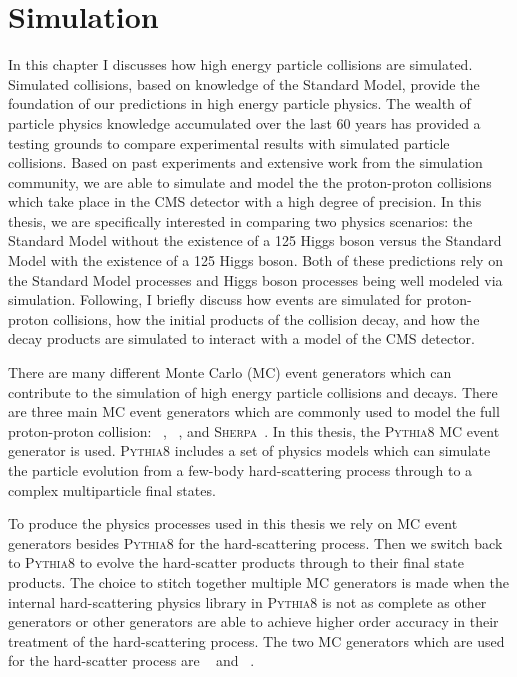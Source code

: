 \chapter{Simulation}
\label{sec:simulation}
In this chapter I discusses how high energy particle
collisions are simulated. Simulated collisions, based on knowledge of the Standard Model, provide 
the foundation of our predictions in high energy particle physics. 
The wealth of particle physics knowledge accumulated over the last 
60 years has provided a testing grounds to compare experimental results with
simulated particle collisions. Based on past experiments and extensive work from the simulation community,
we are able to simulate and model the the proton-proton collisions which take place in the
CMS detector with a high degree of precision. 
In this thesis, we are specifically interested in comparing two physics scenarios: the Standard Model 
without the existence of a 125 \GeV Higgs boson versus the Standard Model with the existence
of a 125 \GeV Higgs boson. Both of these predictions rely on the Standard Model processes and
Higgs boson processes being well modeled via simulation.
Following, I briefly discuss how events are simulated for proton-proton collisions,
how the initial products of the collision decay, and how the decay products are simulated
to interact with a model of the CMS detector.

There are many different Monte Carlo (MC) event generators which can contribute to the 
simulation of high energy particle collisions and decays. There are three main MC event
generators which are commonly used to model the full proton-proton collision: 
\PYTHIA~\cite{Sjostrand:2014zea}, \HERWIG~\cite{Bahr:2008pv}, and \textsc{Sherpa}~\cite{Gleisberg:2008ta}. 
In this thesis, the \textsc{Pythia8} MC event generator is used. \textsc{Pythia8} includes a set of physics models
which can simulate the particle evolution from a few-body hard-scattering process through
to a complex multiparticle final states.

To produce the physics processes used in this
thesis we rely on MC event generators besides \textsc{Pythia8} for the hard-scattering process.
Then we switch back to \textsc{Pythia8} to evolve the hard-scatter products through 
to their final state products. The
choice to stitch together multiple MC generators is made when the internal
hard-scattering physics library in \textsc{Pythia8} is not as complete as other generators or other
generators are able to achieve higher order accuracy in their treatment of the
hard-scattering process. The two MC generators which are used for the hard-scatter
process are \POWHEG~\cite{Alioli:2010xd,Frixione:2007vw} and 
\MGAMCNLO~\cite{Alwall:2011uj,Alwall:2014hca}.

